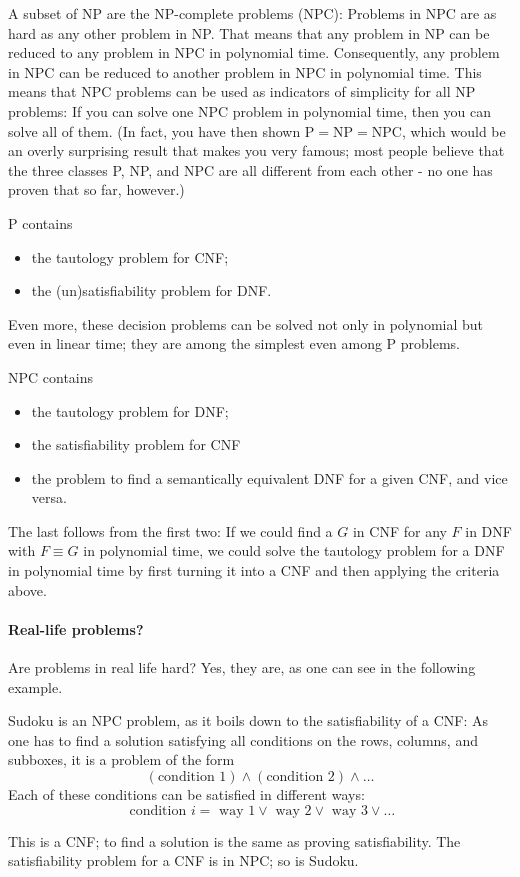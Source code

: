 A subset of NP are the NP-complete problems (NPC): Problems in NPC are as hard as any other problem in NP. That means that any problem in NP can be reduced to any problem in NPC in polynomial time. Consequently, any problem in NPC can be reduced to another problem in NPC in polynomial time. This means that NPC problems can be used as indicators of simplicity for all NP problems: If you can solve one NPC problem in polynomial time, then you can solve all of them. (In fact, you have then shown $\mathrm{P}=\mathrm{NP}=\mathrm{NPC}$, which would be an overly surprising result that makes you very famous; most people believe that the three classes P, NP, and NPC are all different from each other - no one has proven that so far, however.)


\begin{example}[Elements of P] 
P contains
\begin{itemize}
\item the tautology problem for CNF;
\item the (un)satisfiability problem for DNF.
\end{itemize}
Even more, these decision problems can be solved not only in polynomial but even in linear time; they are among the simplest even among P problems. 
\end{example}


\begin{example}
NPC contains
\begin{itemize}
\item the tautology problem for DNF;
\item the satisfiability problem for CNF
\item the problem to find a semantically equivalent DNF for a given CNF, and vice versa.
\end{itemize}
The last follows from the first two: If we could find a $G$ in CNF for any $F$ in DNF with $F \equiv G$ in polynomial time, we could solve the tautology problem for a DNF in polynomial time by first turning it into a CNF and then applying the criteria above.
\end{example}

\paragraph{Real-life problems?}
Are problems in real life hard? Yes, they are, as one can see in the following example.
\begin{example}[Sudoku]
Sudoku is an NPC problem, as it boils down to the satisfiability of a CNF: As one has to find a solution satisfying all conditions on the rows, columns, and subboxes, it is a problem of the form
\begin{equation}\label{eq:real_life_problem}
(\text{condition 1}) \wedge (\text{condition 2}) \wedge \ldots
\end{equation}
Each of these conditions can be satisfied in different ways:
$$
\text { condition } i =\text { way } 1 \vee \text { way } 2 \vee \text { way } 3 \vee \ldots
$$

This is a CNF; to find a solution is the same as proving satisfiability. 
The satisfiability problem for a CNF is in NPC; so is Sudoku.
\end{example} 

